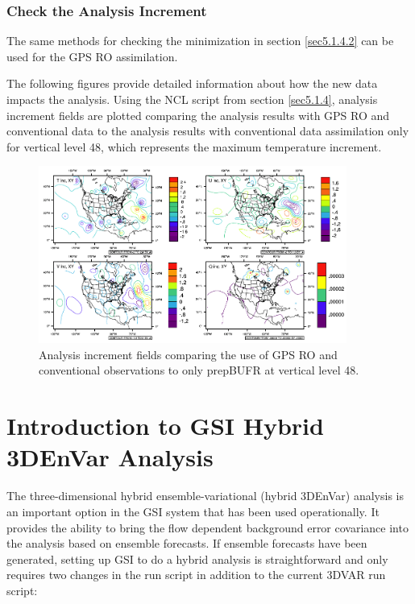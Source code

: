 \subsubsection{Check the Analysis Increment}

The same methods for checking the minimization in section \ref{sec5.1.4.2} can be used for the GPS RO assimilation. 

The following figures provide detailed information about how the new data impacts the analysis.  Using the NCL script from section \ref{sec5.1.4}, analysis increment fields are plotted comparing the analysis results with GPS RO and conventional data to the analysis results with conventional data assimilation only for vertical level 48, which represents the maximum temperature increment.  

\begin{figure}[h!]
  \centering
  \includegraphics[width=0.9\textwidth]{images/increments_bufr}
  \caption{Analysis increment fields comparing the use of GPS RO and conventional observations to only prepBUFR at vertical level 48.}
  \label{fig:increments_bufr}
\end{figure}

\section{Introduction to GSI Hybrid 3DEnVar Analysis}

The three-dimensional hybrid ensemble-variational (hybrid 3DEnVar) analysis is an important option in the GSI system that has been used operationally. It provides the ability to bring the flow dependent background error covariance into the analysis based on ensemble forecasts. If ensemble forecasts have been generated, setting up GSI to do a hybrid analysis is straightforward and only requires two changes in the run script in addition to the current 3DVAR run script:

